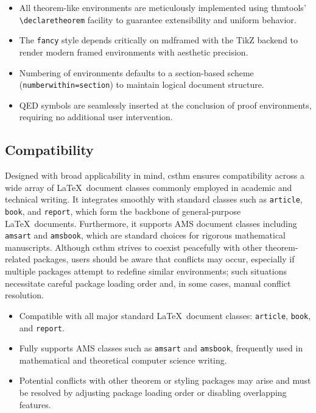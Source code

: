 \documentclass[10pt,letterpaper]{amsart}
\begin{document}
\begin{itemize}[label={--}]
	\item All theorem-like environments are meticulously implemented using
	      \textsf{thmtools}' \verb|\declaretheorem| facility to guarantee extensibility
	      and uniform behavior.
	\item The \texttt{fancy} style depends critically on \textsf{mdframed} with the
	      \textsf{TikZ} backend to render modern framed environments with aesthetic
	      precision.
	\item Numbering of environments defaults to a section-based scheme
	      (\texttt{numberwithin=section}) to maintain logical document structure.
	\item QED symbols are seamlessly inserted at the conclusion of proof environments,
	      requiring no additional user intervention.
\end{itemize}

\subsection{Compatibility}

Designed with broad applicability in mind, \textsf{csthm} ensures compatibility
across a wide array of \LaTeX\ document classes commonly employed in academic
and technical writing. It integrates smoothly with standard classes such as
\texttt{article}, \texttt{book}, and \texttt{report}, which form the backbone
of general-purpose \LaTeX\ documents. Furthermore, it supports AMS document
classes including \texttt{amsart} and \texttt{amsbook}, which are standard
choices for rigorous mathematical manuscripts. Although \textsf{csthm} strives
to coexist peacefully with other theorem-related packages, users should be
aware that conflicts may occur, especially if multiple packages attempt to
redefine similar environments; such situations necessitate careful package
loading order and, in some cases, manual conflict resolution.

\begin{itemize}[label={--}]
	\item Compatible with all major standard \LaTeX\ document classes: \texttt{article},
	      \texttt{book}, and \texttt{report}.
	\item Fully supports AMS classes such as \texttt{amsart} and \texttt{amsbook},
	      frequently used in mathematical and theoretical computer science writing.
	\item Potential conflicts with other theorem or styling packages may arise and must
	      be resolved by adjusting package loading order or disabling overlapping
	      features.
\end{itemize}
\end{document}
